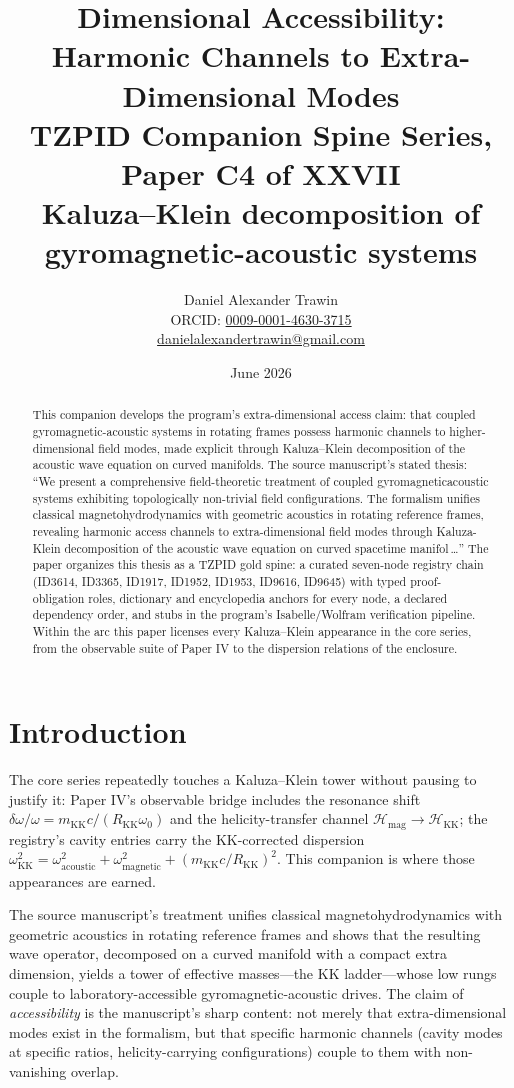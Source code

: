 \documentclass[11pt]{article}
\title{Dimensional Accessibility: Harmonic Channels to Extra-Dimensional Modes\\[0.6em]
\large TZPID Companion Spine Series, Paper C4 of XXVII\\
\normalsize Kaluza--Klein decomposition of gyromagnetic-acoustic systems}
\author{Daniel Alexander Trawin\\
\small ORCID: \href{https://orcid.org/0009-0001-4630-3715}{0009-0001-4630-3715}\\
\small \href{mailto:danielalexandertrawin@gmail.com}{danielalexandertrawin@gmail.com}}
\date{June 2026}
\theoremstyle{remark}
\begin{document}
\maketitle

\begin{abstract}
This companion develops the program's extra-dimensional access claim: that coupled gyromagnetic-acoustic systems in rotating frames possess harmonic channels to higher-dimensional field modes, made explicit through Kaluza--Klein decomposition of the acoustic wave equation on curved manifolds.
The source manuscript's stated thesis: ``We present a comprehensive field-theoretic treatment of coupled gyromagneticacoustic systems exhibiting topologically non-trivial field configurations. The formalism unifies classical magnetohydrodynamics with geometric acoustics in rotating reference frames, revealing harmonic access channels to extra-dimensional field modes through Kaluza-Klein decomposition of the acoustic wave equation on curved spacetime manifol\,\ldots'' The paper organizes this thesis as a TZPID gold spine: a curated seven-node registry chain (ID3614, ID3365, ID1917, ID1952, ID1953, ID9616, ID9645) with typed proof-obligation roles, dictionary and encyclopedia anchors for every node, a declared dependency order, and stubs in the program's Isabelle/Wolfram verification pipeline. Within the arc this paper licenses every Kaluza--Klein appearance in the core series, from the observable suite of Paper IV to the dispersion relations of the enclosure.
\end{abstract}

\section{Introduction}
\label{sec:intro}

The core series repeatedly touches a Kaluza--Klein tower without pausing to justify it: Paper IV's observable bridge includes the resonance shift $\delta\omega/\omega = m_{\mathrm{KK}}c/(R_{\mathrm{KK}}\omega_0)$ and the helicity-transfer channel $\mathcal{H}_{\mathrm{mag}} \to \mathcal{H}_{\mathrm{KK}}$; the registry's cavity entries carry the KK-corrected dispersion $\omega^2_{\mathrm{KK}} = \omega^2_{\mathrm{acoustic}} + \omega^2_{\mathrm{magnetic}} + (m_{\mathrm{KK}}c/R_{\mathrm{KK}})^2$. This companion is where those appearances are earned.

The source manuscript's treatment unifies classical magnetohydrodynamics with geometric acoustics in rotating reference frames and shows that the resulting wave operator, decomposed on a curved manifold with a compact extra dimension, yields a tower of effective masses---the KK ladder---whose low rungs couple to laboratory-accessible gyromagnetic-acoustic drives. The claim of \emph{accessibility} is the manuscript's sharp content: not merely that extra-dimensional modes exist in the formalism, but that specific harmonic channels (cavity modes at specific ratios, helicity-carrying configurations) couple to them with non-vanishing overlap.
\end{document}
